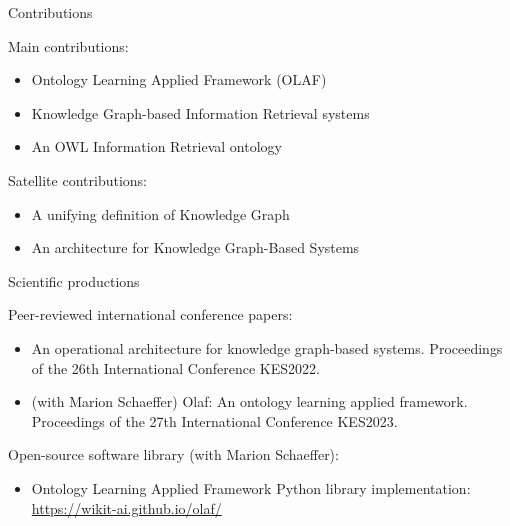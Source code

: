 \begin{frame}{Contributions}


    Main contributions:
    \begin{itemize}
        \item Ontology Learning Applied Framework (OLAF)
        \item Knowledge Graph-based Information Retrieval systems
        \item An OWL Information Retrieval ontology
    \end{itemize}

    Satellite contributions:
    \begin{itemize}
        \item A unifying definition of Knowledge Graph
        \item An architecture for Knowledge Graph-Based Systems
    \end{itemize}
    
\end{frame}

\begin{frame}{Scientific productions}

    Peer-reviewed international conference papers:
    \begin{itemize}
        \item An operational architecture for knowledge graph-based systems. Proceedings of the 26th International Conference KES2022.
        \item (with Marion Schaeffer) Olaf: An ontology learning applied framework. Proceedings of the 27th International Conference KES2023.
    \end{itemize}

    Open-source software library (with Marion Schaeffer):
    \begin{itemize}
        \item Ontology Learning Applied Framework Python library implementation:\\\href{https://wikit-ai.github.io/olaf/}{https://wikit-ai.github.io/olaf/}
    \end{itemize}

\end{frame}
